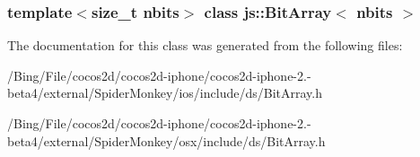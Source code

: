 \subsubsection*{template$<$size\-\_\-t nbits$>$ class js\-::\-Bit\-Array$<$ nbits $>$}



The documentation for this class was generated from the following files\-:\begin{DoxyCompactItemize}
\item 
/\-Bing/\-File/cocos2d/cocos2d-\/iphone/cocos2d-\/iphone-\/2.-\/beta4/external/\-Spider\-Monkey/ios/include/ds/Bit\-Array.\-h\item 
/\-Bing/\-File/cocos2d/cocos2d-\/iphone/cocos2d-\/iphone-\/2.-\/beta4/external/\-Spider\-Monkey/osx/include/ds/Bit\-Array.\-h\end{DoxyCompactItemize}
